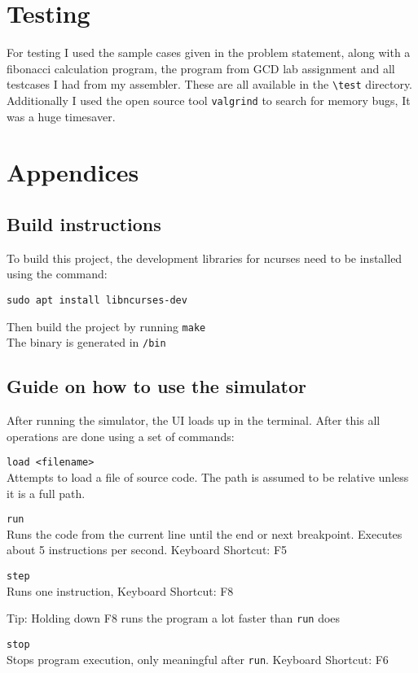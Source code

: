 \documentclass[12pt]{article}
\begin{document}
	\section{Testing}

	For testing I used the sample cases given in the problem statement, along with a fibonacci calculation program, the program from GCD lab assignment and all testcases I had from my assembler. These are all available in the \verb|\test| directory. Additionally I used the open source tool \verb|valgrind| to search for memory bugs, It was a huge timesaver.

	\newpage
	\appendix
	\section{Appendices}
	
	\subsection{Build instructions}

	To build this project, the development libraries for ncurses need to be installed using the command:

	\verb|sudo apt install libncurses-dev|	

	Then build the project by running \verb|make|\\
	The binary is generated in \verb|/bin|

	\subsection{Guide on how to use the simulator}

	After running the simulator, the UI loads up in the terminal. After this all operations are done using a set of commands:

	\verb|load <filename>|\\
	Attempts to load a file of source code. The path is assumed to be relative unless it is a full path.
	
	\verb|run|\\
	Runs the code from the current line until the end or next breakpoint. Executes about 5 instructions per second. Keyboard Shortcut: F5

	\verb|step|\\
	Runs one instruction, Keyboard Shortcut: F8

	Tip: Holding down F8 runs the program a lot faster than \verb|run| does

	\verb|stop|\\
	Stops program execution, only meaningful after \verb|run|. Keyboard Shortcut: F6
\end{document}
